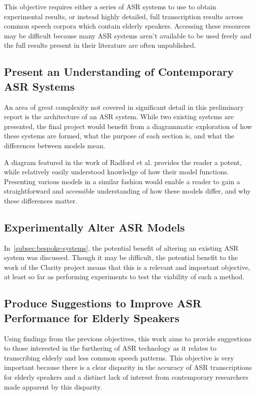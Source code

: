This objective requires either a series of ASR systems to use to obtain experimental results, or
instead highly detailed, full transcription results across common speech corpora which contain
elderly speakers.
Accessing these resources may be difficult because many ASR systems aren't available to be used
freely and the full results present in their literature are often unpublished.

\subsection{Present an Understanding of Contemporary ASR Systems}\label{subsec:aim2andahalf}

An area of great complexity not covered in significant detail in this preliminary report is the
architecture of an ASR system.
While two existing systems are presented, the final project would benefit from a diagrammatic
exploration of how these systems are formed, what the purpose of each section is, and what the
differences between models mean.

A diagram featured in the work of Radford et al.\cite{whisper} provides the reader a potent, while
relatively easily understood knowledge of how their model functions.
Presenting various models in a similar fashion would enable a reader to gain a straightforward and
accessible understanding of how these models differ, and why these differences matter.

\subsection{Experimentally Alter ASR Models}\label{subsec:aim3}

In~\ref{subsec:bespoke-systems}, the potential benefit of altering an existing ASR system was
discussed.
Though it may be difficult, the potential benefit to the work of the Clarity project means that
this is a relevant and important objective, at least so far as performing experiments to test the
viability of such a method.

\subsection{Produce Suggestions to Improve ASR Performance for Elderly Speakers}\label{subsec:aim4}

Using findings from the previous objectives, this work aims to provide suggestions to those
interested in the furthering of ASR technology as it relates to transcribing elderly and less
common speech patterns.
This objective is very important because there is a clear disparity in the accuracy of ASR
transcriptions for elderly speakers and a distinct lack of interest from contemporary researchers
made apparent by this disparity.